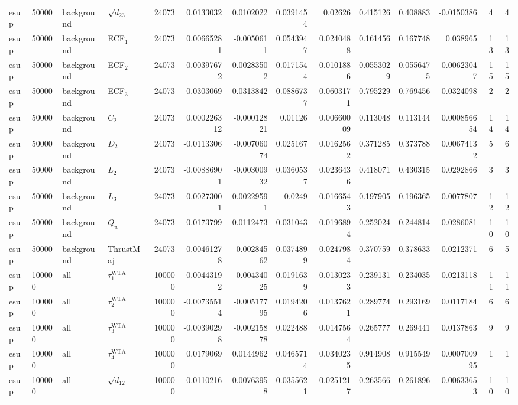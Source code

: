 \begin{landscape}
\begin{longtable}{llll r rrrr rr r rr}
esup & 50000 & background & $\sqrt{d_{23}}$ & 24073 & 0.0133032 & 0.0102022 & 0.0391454 & 0.02626 & 0.415126 & 0.408883 & -0.0150386 & 4 & 4 \\
esup & 50000 & background & ECF$_1$ & 24073 & 0.00665281 & -0.0050611 & 0.0543947 & 0.0240488 & 0.161456 & 0.167748 & 0.038965 & 13 & 13 \\
esup & 50000 & background & ECF$_2$ & 24073 & 0.00397672 & 0.00283502 & 0.0171544 & 0.0101886 & 0.0553029 & 0.0556475 & 0.00623047 & 15 & 15 \\
esup & 50000 & background & ECF$_3$ & 24073 & 0.0303069 & 0.0313842 & 0.0886737 & 0.0603171 & 0.795229 & 0.769456 & -0.0324098 & 2 & 2 \\
esup & 50000 & background & $C_2$ & 24073 & 0.000226312 & -0.00012821 & 0.01126 & 0.00660009 & 0.113048 & 0.113144 & 0.000856654 & 14 & 14 \\
esup & 50000 & background & $D_2$ & 24073 & -0.0113306 & -0.00706074 & 0.025167 & 0.0162562 & 0.371285 & 0.373788 & 0.00674132 & 5 & 6 \\
esup & 50000 & background & $L_2$ & 24073 & -0.00886901 & -0.00300932 & 0.0360537 & 0.0236436 & 0.418071 & 0.430315 & 0.0292866 & 3 & 3 \\
esup & 50000 & background & $L_3$ & 24073 & 0.00273001 & 0.00229591 & 0.0249 & 0.0166543 & 0.197905 & 0.196365 & -0.0077807 & 12 & 12 \\
esup & 50000 & background & $Q_w$ & 24073 & 0.0173799 & 0.0112473 & 0.031043 & 0.0196894 & 0.252024 & 0.244814 & -0.0286081 & 10 & 10 \\
esup & 50000 & background & ThrustMaj & 24073 & -0.00461278 & -0.00284562 & 0.0374899 & 0.0247984 & 0.370759 & 0.378633 & 0.0212371 & 6 & 5 \\
esup & 100000 & all & $\tau_1^{\mathrm{WTA}}$ & 100000 & -0.00443192 & -0.00434025 & 0.0191639 & 0.0130233 & 0.239131 & 0.234035 & -0.0213118 & 11 & 11 \\
esup & 100000 & all & $\tau_2^{\mathrm{WTA}}$ & 100000 & -0.00735514 & -0.00517795 & 0.0194206 & 0.0137621 & 0.289774 & 0.293169 & 0.0117184 & 6 & 6 \\
esup & 100000 & all & $\tau_3^{\mathrm{WTA}}$ & 100000 & -0.00390298 & -0.00215878 & 0.022488 & 0.0147564 & 0.265777 & 0.269441 & 0.0137863 & 9 & 9 \\
esup & 100000 & all & $\tau_4^{\mathrm{WTA}}$ & 100000 & 0.0179069 & 0.0144962 & 0.0465714 & 0.0340235 & 0.914908 & 0.915549 & 0.000700995 & 1 & 1 \\
esup & 100000 & all & $\sqrt{d_{12}}$ & 100000 & 0.0110216 & 0.00763958 & 0.0355621 & 0.0251217 & 0.263566 & 0.261896 & -0.00633653 & 10 & 10 \\

\end{longtable}
\end{landscape}
